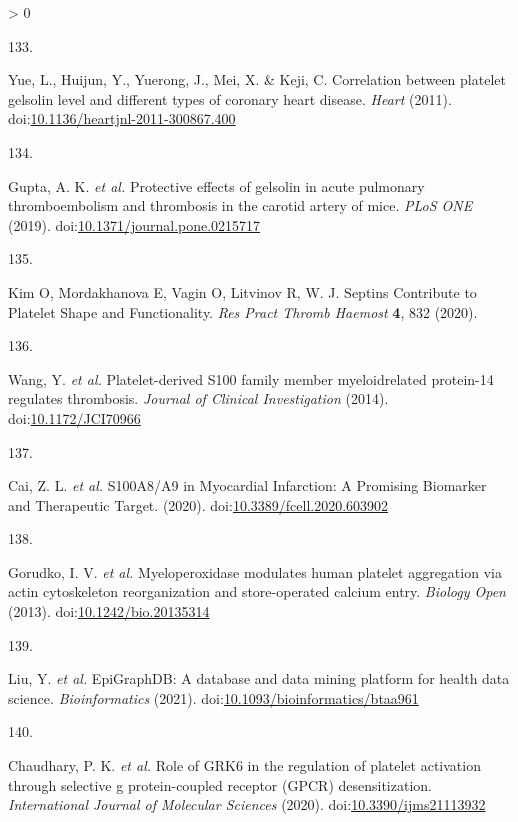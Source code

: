 \documentclass[11pt,twoside]{bristolthesis}
\newlength{\cslhangindent}
\newlength{\csllabelwidth}
\newenvironment{CSLReferences}[2] %
 {%
  \setlength{\parindent}{0pt}
  \ifodd #1 \everypar{\setlength{\hangindent}{\cslhangindent}}\ignorespaces\fi
  \ifnum #2 > 0
  \setlength{\parskip}{#2\baselineskip}
  \fi
 }%
 {}
\newcommand{\CSLLeftMargin}[1]{\parbox[t]{\csllabelwidth}{#1}}
\newcommand{\CSLRightInline}[1]{\parbox[t]{\linewidth - \csllabelwidth}{#1}\break}
\begin{document}
\begin{CSLReferences}{0}{0}
\leavevmode\hypertarget{ref-Yue2011}{}%
\CSLLeftMargin{133. }
\CSLRightInline{Yue, L., Huijun, Y., Yuerong, J., Mei, X. \& Keji, C. {Correlation between platelet gelsolin level and different types of coronary heart disease}. \emph{Heart} (2011). doi:\href{https://doi.org/10.1136/heartjnl-2011-300867.400}{10.1136/heartjnl-2011-300867.400}}

\leavevmode\hypertarget{ref-Gupta2019}{}%
\CSLLeftMargin{134. }
\CSLRightInline{Gupta, A. K. \emph{et al.} {Protective effects of gelsolin in acute pulmonary thromboembolism and thrombosis in the carotid artery of mice}. \emph{PLoS ONE} (2019). doi:\href{https://doi.org/10.1371/journal.pone.0215717}{10.1371/journal.pone.0215717}}

\leavevmode\hypertarget{ref-Kim2020}{}%
\CSLLeftMargin{135. }
\CSLRightInline{Kim O, Mordakhanova E, Vagin O, Litvinov R, W. J. {Septins Contribute to Platelet Shape and Functionality}. \emph{Res Pract Thromb Haemost} \textbf{4}, 832 (2020).}

\leavevmode\hypertarget{ref-Wang2014a}{}%
\CSLLeftMargin{136. }
\CSLRightInline{Wang, Y. \emph{et al.} {Platelet-derived S100 family member myeloidrelated protein-14 regulates thrombosis}. \emph{Journal of Clinical Investigation} (2014). doi:\href{https://doi.org/10.1172/JCI70966}{10.1172/JCI70966}}

\leavevmode\hypertarget{ref-Cai2020}{}%
\CSLLeftMargin{137. }
\CSLRightInline{Cai, Z. L. \emph{et al.} {S100A8/A9 in Myocardial Infarction: A Promising Biomarker and Therapeutic Target}. (2020). doi:\href{https://doi.org/10.3389/fcell.2020.603902}{10.3389/fcell.2020.603902}}

\leavevmode\hypertarget{ref-Gorudko2013}{}%
\CSLLeftMargin{138. }
\CSLRightInline{Gorudko, I. V. \emph{et al.} {Myeloperoxidase modulates human platelet aggregation via actin cytoskeleton reorganization and store-operated calcium entry}. \emph{Biology Open} (2013). doi:\href{https://doi.org/10.1242/bio.20135314}{10.1242/bio.20135314}}

\leavevmode\hypertarget{ref-Liu2021}{}%
\CSLLeftMargin{139. }
\CSLRightInline{Liu, Y. \emph{et al.} {EpiGraphDB: A database and data mining platform for health data science}. \emph{Bioinformatics} (2021). doi:\href{https://doi.org/10.1093/bioinformatics/btaa961}{10.1093/bioinformatics/btaa961}}

\leavevmode\hypertarget{ref-Chaudhary2020}{}%
\CSLLeftMargin{140. }
\CSLRightInline{Chaudhary, P. K. \emph{et al.} {Role of GRK6 in the regulation of platelet activation through selective g protein-coupled receptor (GPCR) desensitization}. \emph{International Journal of Molecular Sciences} (2020). doi:\href{https://doi.org/10.3390/ijms21113932}{10.3390/ijms21113932}}


\end{CSLReferences}
\end{document}
